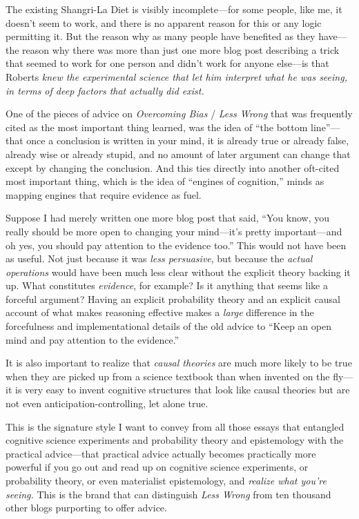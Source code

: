 {
 The existing Shangri-La Diet is visibly incomplete---for some
people, like me, it doesn't seem to work, and there is
no apparent reason for this or any logic permitting it. But the reason
why as many people have benefited as they have---the reason why there
was more than just one more blog post describing a trick that seemed to
work for one person and didn't work for anyone
else---is that Roberts \textit{knew the experimental science that let
him interpret what he was seeing, in terms of deep factors that
actually did exist.}}

{
 One of the pieces of advice on \textit{Overcoming Bias} /
\textit{Less Wrong} that was frequently cited as the most important
thing learned, was the idea of ``the bottom
line''---that once a conclusion is written in your
mind, it is already true or already false, already wise or already
stupid, and no amount of later argument can change that except by
changing the conclusion. And this ties directly into another oft-cited
most important thing, which is the idea of ``engines
of cognition,'' minds as mapping engines that require
evidence as fuel.}

{
 Suppose I had merely written one more blog post that said,
``You know, you really should be more open to changing
your mind---it's pretty important---and oh yes, you
should pay attention to the evidence too.'' This
would not have been as useful. Not just because it was \textit{less
persuasive}, but because the \textit{actual operations} would have been
much less clear without the explicit theory backing it up. What
constitutes \textit{evidence}, for example? Is it anything that seems
like a forceful argument? Having an explicit probability theory and an
explicit causal account of what makes reasoning effective makes a
\textit{large} difference in the forcefulness and implementational
details of the old advice to ``Keep an open mind and
pay attention to the evidence.''}

{
 It is also important to realize that \textit{causal theories} are
much more likely to be true when they are picked up from a science
textbook than when invented on the fly---it is very easy to invent
cognitive structures that look like causal theories but are not even
anticipation-controlling, let alone true.}

{
 This is the signature style I want to convey from all those essays
that entangled cognitive science experiments and probability theory and
epistemology with the practical advice---that practical advice actually
becomes practically more powerful if you go out and read up on
cognitive science experiments, or probability theory, or even
materialist epistemology, and \textit{realize what
you're seeing.} This is the brand that can distinguish
\textit{Less Wrong} from ten thousand other blogs purporting to offer
advice.}

